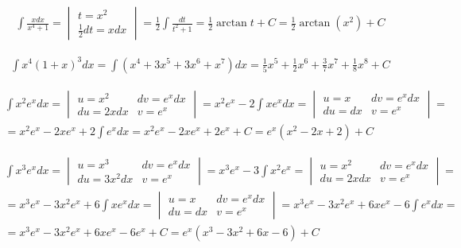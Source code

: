 \begin{gather*}
  \int \frac{xdx}{x^4+1} =
  \begin{vmatrix}
    t=x^2 \\
    \frac{1}{2}dt=xdx
  \end{vmatrix}
  = \frac{1}{2} \int \frac{dt}{t^2+1}
  = \frac{1}{2}\arctan t + C
  = \frac{1}{2}\arctan (x^2)+C
\end{gather*}


\begin{gather*}
  \int x^4(1+x)^3dx
  = \int (x^4+3x^5+3x^6+x^7)dx
  = \frac{1}{5}x^5+\frac{1}{2}x^6+\frac{3}{7}x^7+\frac{1}{8}x^8+C
\end{gather*}


\begin{gather*}
  \int x^2e^xdx =
  \begin{vmatrix}
    u=x^2 & dv=e^xdx \\
    du=2xdx & v=e^x
  \end{vmatrix}
  = x^2e^x - 2 \int xe^x dx =
  \begin{vmatrix}
    u=x & dv=e^x dx \\
    du=dx & v=e^x
  \end{vmatrix} = \\
  = x^2e^x - 2xe^x + 2 \int e^x dx
  = x^2e^x - 2xe^x + 2e^x + C
  = e^x(x^2-2x+2)+C
\end{gather*}


\begin{gather*}
  \int x^3e^x dx =
  \begin{vmatrix}
    u=x^3 & dv=e^xdx \\
    du=3x^2dx & v=e^x
  \end{vmatrix}
  = x^3e^x - 3\int x^2e^x =
  \begin{vmatrix}
    u=x^2 & dv=e^xdx \\
    du=2xdx & v=e^x
  \end{vmatrix} = \\
  = x^3e^x - 3x^2e^x + 6 \int xe^x dx =
  \begin{vmatrix}
    u=x & dv=e^x dx \\
    du=dx & v=e^x
  \end{vmatrix}
  = x^3e^x - 3x^2e^x + 6xe^x - 6\int e^x dx = \\
  = x^3e^x - 3x^2e^x + 6xe^x - 6e^x + C
  = e^x(x^3-3x^2+6x-6)+C
\end{gather*}

